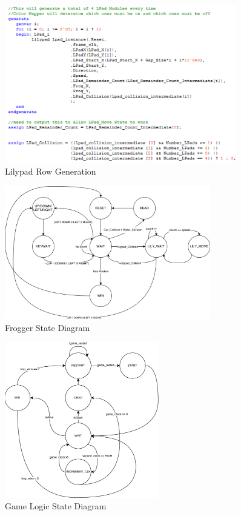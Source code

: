\documentclass[journal, twocolumn, final,11pt,letterpaper]{IEEEtran}
\begin{document}
\begin{figure}[H]
	\centering
	\includegraphics[width=0.9\textwidth]{lpad_row_generation.png}
	\caption{Lilypad Row Generation}
	\label{fig:lpad-row-generation}
\end{figure}


\begin{figure}[H]
	\centering
	\includegraphics[width=0.8\textwidth]{frogger_state_diagram.png}
	\caption{Frogger State Diagram}
	\label{fig:frogger-state}
\end{figure}

\begin{figure}[H]
	\centering
	\includegraphics[width=0.6\textwidth]{game_logic_state_diagram.png}
	\caption{Game Logic State Diagram}
	\label{fig:game-logic-state-diagram}

\end{figure}
\end{document}
